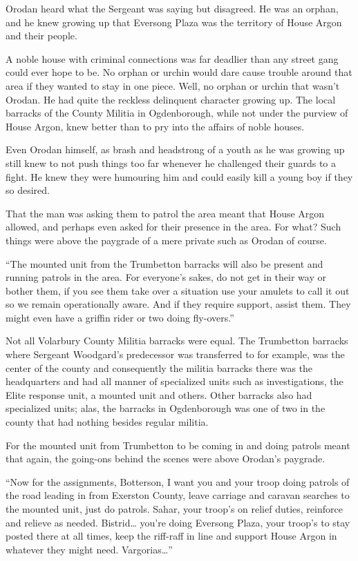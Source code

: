 \documentclass[a4paper,10pt]{book}
\begin{document}
Orodan heard what the Sergeant was saying but disagreed. He was an orphan, and he knew growing up that Eversong Plaza was the territory of House Argon and their people.\par
A noble house with criminal connections was far deadlier than any street gang could ever hope to be. No orphan or urchin would dare cause trouble around that area if they wanted to stay in one piece. Well, no orphan or urchin that wasn’t Orodan. He had quite the reckless delinquent character growing up. The local barracks of the County Militia in Ogdenborough, while not under the purview of House Argon, knew better than to pry into the affairs of noble houses.\par
Even Orodan himself, as brash and headstrong of a youth as he was growing up still knew to not push things too far whenever he challenged their guards to a fight. He knew they were humouring him and could easily kill a young boy if they so desired.\par
That the man was asking them to patrol the area meant that House Argon allowed, and perhaps even asked for their presence in the area. For what? Such things were above the paygrade of a mere private such as Orodan of course.\par
“The mounted unit from the Trumbetton barracks will also be present and running patrols in the area. For everyone’s sakes, do not get in their way or bother them, if you see them take over a situation use your amulets to call it out so we remain operationally aware. And if they require support, assist them. They might even have a griffin rider or two doing fly-overs.”\par
Not all Volarbury County Militia barracks were equal. The Trumbetton barracks where Sergeant Woodgard’s predecessor was transferred to for example, was the center of the county and consequently the militia barracks there was the headquarters and had all manner of specialized units such as investigations, the Elite response unit, a mounted unit and others. Other barracks also had specialized units; alas, the barracks in Ogdenborough was one of two in the county that had nothing besides regular militia.\par
For the mounted unit from Trumbetton to be coming in and doing patrols meant that again, the going-ons behind the scenes were above Orodan’s paygrade.\par
“Now for the assignments, Botterson, I want you and your troop doing patrols of the road leading in from Exerston County, leave carriage and caravan searches to the mounted unit, just do patrols. Sahar, your troop’s on relief duties, reinforce and relieve as needed. Bistrid… you’re doing Eversong Plaza, your troop’s to stay posted there at all times, keep the riff-raff in line and support House Argon in whatever they might need. Vargorias…”\par
\end{document}
